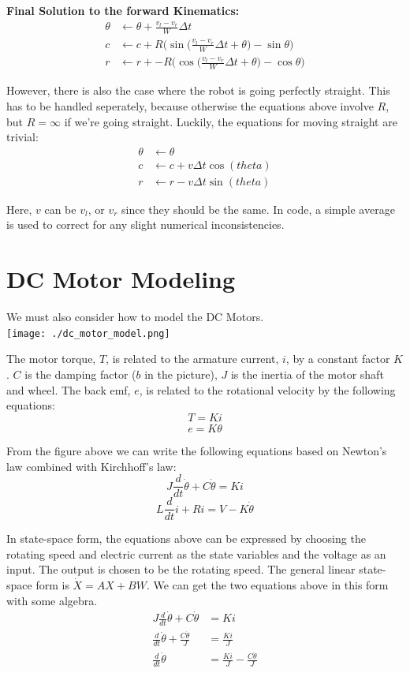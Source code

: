 \documentclass{article}
\begin{document}
\textbf{Final Solution to the forward Kinematics:}
\begin{align}
 \theta &\leftarrow \theta + \frac{v_l-v_r}{W}\Delta t \\
  c &\leftarrow c + R\Bigg(\sin{\Big(\frac{v_l-v_r}{W}\Delta t+\theta\Big)}-\sin{\theta}\Bigg) \\
  r &\leftarrow r + -R\Bigg(\cos{\Big(\frac{v_l-v_r}{W}\Delta t+\theta\Big)}-\cos{\theta}\Bigg)
\end{align}

However, there is also the case where the robot is going perfectly straight. This has to be handled seperately, because otherwise the equations above involve $R$, but $R=\infty$ if we're going straight. Luckily, the equations for moving straight are trivial:
\begin{align}
 \theta &\leftarrow \theta \\
  c &\leftarrow c + v\Delta t\cos(theta) \\
  r &\leftarrow r - v\Delta t\sin(theta)
\end{align}

Here, $v$ can be $v_l$, or $v_r$ since they should be the same. In code, a simple average is used to correct for any slight numerical inconsistencies. \\

\section{DC Motor Modeling}
We must also consider how to model the DC Motors. \\

\texttt{[image: ./dc\_motor\_model.png]}

The motor torque, $T$, is related to the armature current, $i$, by a constant factor $K$. $C$ is the damping factor ($b$ in the picture), $J$ is the inertia of the motor shaft and wheel. The back emf, $e$, is related to the rotational velocity by the following equations:
$$T=Ki$$
$$e=K\dot{\theta}$$

From the figure above we can write the following equations based on Newton's law combined with Kirchhoff's law:
$$J\frac{d}{dt}\dot{\theta} + C\dot{\theta} = Ki$$
$$L\frac{d}{dt}i+Ri=V-K\dot{\theta}$$

In state-space form, the equations above can be expressed by choosing the rotating speed and electric current as the state variables and the voltage as an input. The output is chosen to be the rotating speed. The general linear state-space form is $\dot{X} = AX + BW$. We can get the two equations above in this form with some algebra.
\begin{align}
  J\frac{d}{dt}\dot{\theta} + C\dot{\theta} &= Ki \\
  \frac{d}{dt}\dot{\theta} + \frac{C\dot{\theta}}{J} &= \frac{Ki}{J} \\
  \frac{d}{dt}\dot{\theta} &= \frac{Ki}{J} - \frac{C\dot{\theta}}{J}
\end{align}
\end{document}
